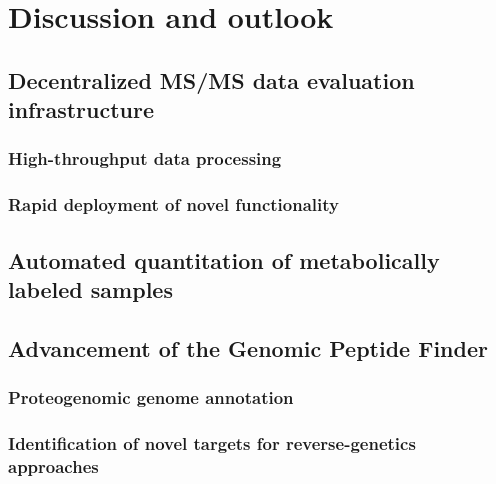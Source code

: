 \chapter{Discussion and outlook}

\section{Decentralized MS/MS data evaluation infrastructure}

\subsection{High-throughput data processing}

\subsection{Rapid deployment of novel functionality}

\section{Automated quantitation of metabolically labeled samples}

\section{Advancement of the Genomic Peptide Finder }

\subsection{Proteogenomic genome annotation}

\subsection{Identification of novel targets for reverse-genetics approaches}
